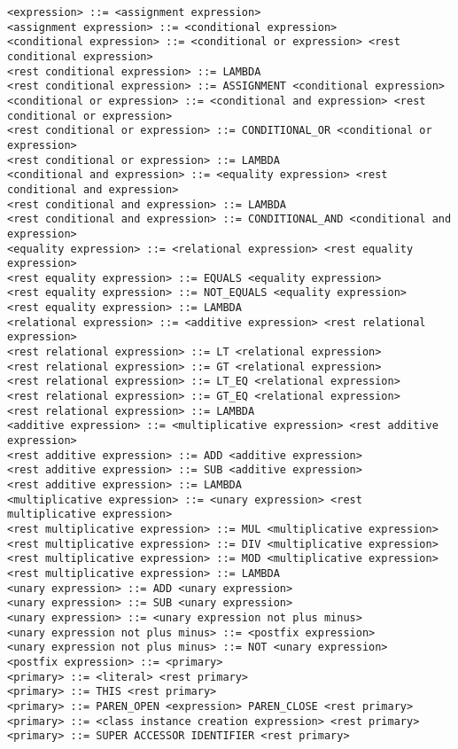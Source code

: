 \documentclass [a4paper,abstracton,titlepage]{scrartcl}
\begin{document}
\begin{lstlisting}<expression> ::= <assignment expression>
<assignment expression> ::= <conditional expression>
<conditional expression> ::= <conditional or expression> <rest conditional expression>
<rest conditional expression> ::= LAMBDA
<rest conditional expression> ::= ASSIGNMENT <conditional expression>
<conditional or expression> ::= <conditional and expression> <rest conditional or expression>
<rest conditional or expression> ::= CONDITIONAL_OR <conditional or expression>
<rest conditional or expression> ::= LAMBDA
<conditional and expression> ::= <equality expression> <rest conditional and expression>
<rest conditional and expression> ::= LAMBDA
<rest conditional and expression> ::= CONDITIONAL_AND <conditional and expression>
<equality expression> ::= <relational expression> <rest equality expression>
<rest equality expression> ::= EQUALS <equality expression>
<rest equality expression> ::= NOT_EQUALS <equality expression>
<rest equality expression> ::= LAMBDA
<relational expression> ::= <additive expression> <rest relational expression>
<rest relational expression> ::= LT <relational expression>
<rest relational expression> ::= GT <relational expression>
<rest relational expression> ::= LT_EQ <relational expression>
<rest relational expression> ::= GT_EQ <relational expression>
<rest relational expression> ::= LAMBDA
<additive expression> ::= <multiplicative expression> <rest additive expression>
<rest additive expression> ::= ADD <additive expression>
<rest additive expression> ::= SUB <additive expression>
<rest additive expression> ::= LAMBDA
<multiplicative expression> ::= <unary expression> <rest multiplicative expression>
<rest multiplicative expression> ::= MUL <multiplicative expression>
<rest multiplicative expression> ::= DIV <multiplicative expression>
<rest multiplicative expression> ::= MOD <multiplicative expression>
<rest multiplicative expression> ::= LAMBDA
<unary expression> ::= ADD <unary expression>
<unary expression> ::= SUB <unary expression>
<unary expression> ::= <unary expression not plus minus>
<unary expression not plus minus> ::= <postfix expression>
<unary expression not plus minus> ::= NOT <unary expression>
<postfix expression> ::= <primary>
<primary> ::= <literal> <rest primary>
<primary> ::= THIS <rest primary>
<primary> ::= PAREN_OPEN <expression> PAREN_CLOSE <rest primary>
<primary> ::= <class instance creation expression> <rest primary>
<primary> ::= SUPER ACCESSOR IDENTIFIER <rest primary>

\end{lstlisting}
\end{document}
